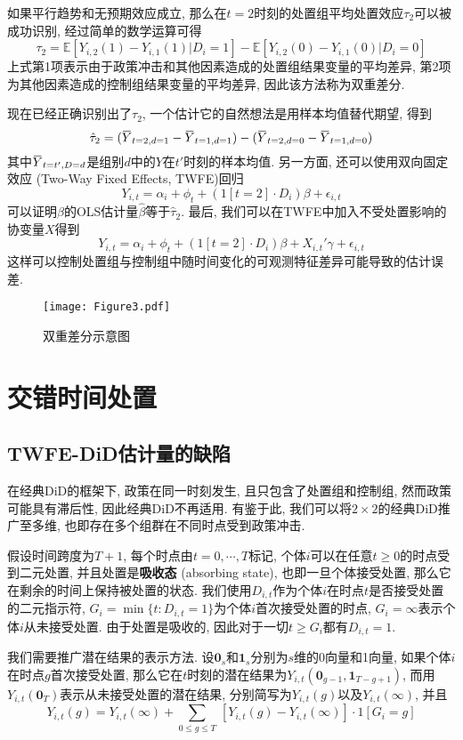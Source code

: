 \documentclass[cn,sakura,14pt,screen,bibstyle=gb7714-2015,math=mtpro2]{elegantnote}
\newcommand{\E}{\mathbb{E}}
\newcommand{\overbar}[1]{\mkern 1.5mu\overline{\mkern-1.5mu#1\mkern-1.5mu}\mkern 1.5mu}
\begin{document}
如果平行趋势和无预期效应成立, 那么在$t=2$时刻的处置组平均处置效应$\tau_2$可以被成功识别, 经过简单的数学运算可得
$$\tau_2=\E[Y_{i,2}(1)-Y_{i,1}(1)|D_i=1]-\E[Y_{i,2}(0)-Y_{i,1}(0)|D_i=0]$$
上式第1项表示由于政策冲击和其他因素造成的处置组结果变量的平均差异, 第2项为其他因素造成的控制组结果变量的平均差异, 因此该方法称为双重差分.

现在已经正确识别出了$\tau_2$, 一个估计它的自然想法是用样本均值替代期望, 得到
$$\hat{\tau}_2=(\overbar{Y}_{t=2,d=1}-\overbar{Y}_{t=1,d=1})-(\overbar{Y}_{t=2,d=0}-\overbar{Y}_{t=1,d=0})$$
其中$\overbar{Y}_{t=t',D=d}$是组别$d$中的$Y$在$t'$时刻的样本均值. 另一方面, 还可以使用双向固定效应 (Two-Way Fixed Effects, TWFE)回归
$$Y_{i,t}=\alpha_i+\phi_t+(1[t=2]\cdot D_i)\beta+\epsilon_{i,t}$$
可以证明$\beta$的OLS估计量$\hat{\beta}$等于$\hat{\tau}_2$. 最后, 我们可以在TWFE中加入不受处置影响的协变量$X$得到
$$Y_{i,t}=\alpha_i+\phi_t+(1[t=2]\cdot D_i)\beta+{X}_{i,t}'\gamma+\epsilon_{i,t}$$
这样可以控制处置组与控制组中随时间变化的可观测特征差异可能导致的估计误差.

\begin{figure}
  \centering
  \texttt{[image: Figure3.pdf]}
  \caption{双重差分示意图}
\end{figure}
\newpage
\section{交错时间处置}
\subsection{TWFE-DiD估计量的缺陷}
在经典DiD的框架下, 政策在同一时刻发生, 且只包含了处置组和控制组, 然而政策可能具有滞后性, 因此经典DiD不再适用. 有鉴于此, 我们可以将$2\times2$的经典DiD推广至多维, 也即存在多个组群在不同时点受到政策冲击.

假设时间跨度为$T+1$, 每个时点由$t=0,\cdots,T$标记, 个体$i$可以在任意$t\ge0$的时点受到二元处置, 并且处置是\textbf{吸收态} (absorbing state), 也即一旦个体接受处置, 那么它在剩余的时间上保持被处置的状态. 我们使用$D_{i,t}$作为个体$i$在时点$t$是否接受处置的二元指示符, $G_i=\min\{t:D_{i,t}=1\}$为个体$i$首次接受处置的时点, $G_i=\infty$表示个体$i$从未接受处置. 由于处置是吸收的, 因此对于一切$t\ge G_i$都有$D_{i,t}=1$.

我们需要推广潜在结果的表示方法. 设$\mathbf{0}_s$和$\mathbf{1}_s$分别为$s$维的0向量和1向量, 如果个体$i$在时点$g$首次接受处置, 那么它在$t$时刻的潜在结果为$Y_{i,t}(\mathbf{0}_{g-1},\mathbf{1}_{T-g+1})$, 而用$Y_{i,t}(\mathbf{0}_T)$表示从未接受处置的潜在结果, 分别简写为$Y_{i,t}(g)$以及$Y_{i,t}(\infty)$, 并且
$$Y_{i,t}(g)=Y_{i,t}(\infty)+\sum_{0\leq g\leq T}\,[Y_{i,t}(g)-Y_{i,t}(\infty)]\cdot 1[G_i=g]$$
\end{document}
